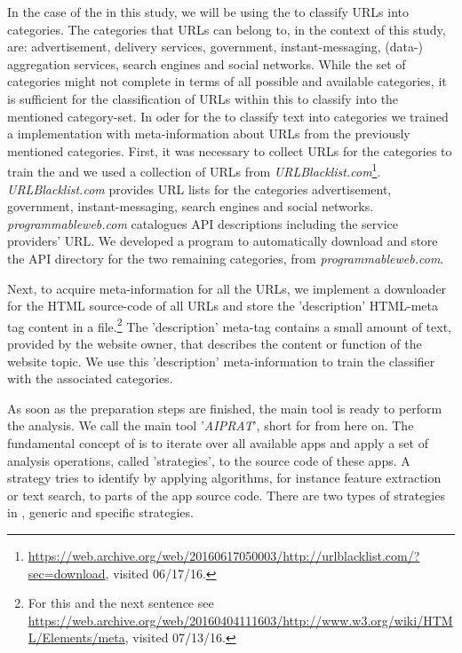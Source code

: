 In the case of the \sca in this study, we will be using the \nbc to classify URLs into categories.
The categories that URLs can belong to, in the context of this study, are: advertisement, delivery services, government, instant-messaging, (data-) aggregation services, search engines and social networks.
While the set of categories might not complete in terms of all possible and available categories, it is sufficient for the classification of URLs within this \sca to classify into the mentioned category-set.
In oder for the \nbc to classify text into categories we trained a \nbc implementation with meta-information about URLs from the previously mentioned categories.
First, it was necessary to collect URLs for the categories to train the \nbc and we used a collection of \acs{URL}s from \textit{URLBlacklist.com}\footnote{\url{https://web.archive.org/web/20160617050003/http://urlblacklist.com/?sec=download}, visited 06/17/16.}.
\textit{URLBlacklist.com} provides URL lists for the categories advertisement, government, instant-messaging, search engines and social networks.
\textit{programmableweb.com} catalogues API descriptions including the service providers' URL.
We developed a program to automatically download and store the API directory for the two remaining categories, from \textit{programmableweb.com}.

Next, to acquire meta-information for all the URLs, we implement a downloader for the HTML source-code of all URLs and store the 'description' HTML-meta tag content in a file.\footnote{For this and the next sentence see \url{https://web.archive.org/web/20160404111603/http://www.w3.org/wiki/HTML/Elements/meta}, visited 07/13/16.}
The 'description' meta-tag contains a small amount of text, provided by the website owner, that describes the content or function of the website topic.
We use this 'description' meta-information to train the classifier with the associated categories.\newline

As soon as the preparation steps are finished, the main \sca tool is ready to perform the \ipr analysis.
We call the main \sca tool '\textit{AIPRAT}', short for \aiprat from here on.
The fundamental concept of \AIPRAT is to iterate over all available apps and apply a set of analysis operations, called 'strategies', to the source code of these apps.
A strategy tries to identify \iprfs by applying algorithms, for instance feature extraction or text search, to parts of the app source code.
There are two types of strategies in \AIPRAT, generic and specific strategies.

